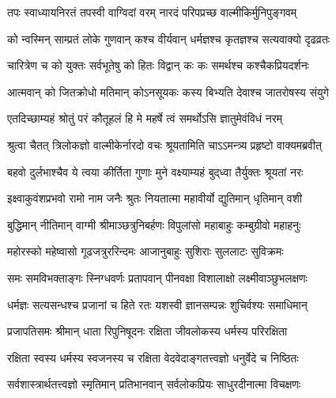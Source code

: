 

\textlink{}
\translink{}

\storymeta


\twolineshloka
{तपः स्वाध्यायनिरतं तपस्वी वाग्विदां वरम्}
{नारदं परिपप्रच्छ वाल्मीकिर्मुनिपुङ्गवम्}%

\twolineshloka
{को न्वस्मिन् साम्प्रतं लोके गुणवान् कश्च वीर्यवान्}
{धर्मज्ञश्च कृतज्ञश्च सत्यवाक्यो दृढव्रतः}%

\twolineshloka
{चारित्रेण च को युक्तः सर्वभूतेषु को हितः}
{विद्वान् कः कः समर्थश्च कश्चैकप्रियदर्शनः}%

\twolineshloka
{आत्मवान् को जितक्रोधो मतिमान् कोऽनसूयकः}
{कस्य बिभ्यति देवाश्च जातरोषस्य संयुगे}%

\twolineshloka
{एतदिच्छाम्यहं श्रोतुं परं कौतूहलं हि मे}
{महर्षे त्वं समर्थोऽसि ज्ञातुमेवंविधं नरम्}%

\twolineshloka
{श्रुत्वा चैतत् त्रिलोकज्ञो वाल्मीकेर्नारदो वचः}
{श्रूयतामिति चाऽऽमन्त्र्य प्रहृष्टो वाक्यमब्रवीत्}%

\twolineshloka
{बहवो दुर्लभाश्चैव ये त्वया कीर्तिता गुणाः}
{मुने वक्ष्याम्यहं बुद्‌ध्वा तैर्युक्तः श्रूयतां नरः}%

\twolineshloka
{इक्ष्वाकुवंशप्रभवो रामो नाम जनैः श्रुतः}
{नियतात्मा महावीर्यो द्युतिमान् धृतिमान् वशी}%

\twolineshloka
{बुद्धिमान् नीतिमान् वाग्मी श्रीमाञ्छत्रुनिबर्हणः}
{विपुलांसो महाबाहुः कम्बुग्रीवो महाहनुः}%

\twolineshloka
{महोरस्को महेष्वासो गूढजत्रुररिन्दमः}
{आजानुबाहुः सुशिराः सुललाटः सुविक्रमः}%

\twolineshloka
{समः समविभक्ताङ्गः स्निग्धवर्णः प्रतापवान्}
{पीनवक्षा विशालाक्षो लक्ष्मीवाञ्छुभलक्षणः}%

\twolineshloka
{धर्मज्ञः सत्यसन्धश्च प्रजानां च हिते रतः}
{यशस्वी ज्ञानसम्पन्नः शुचिर्वश्यः समाधिमान्}%

\twolineshloka
{प्रजापतिसमः श्रीमान् धाता रिपुनिषूदनः}
{रक्षिता जीवलोकस्य धर्मस्य परिरक्षिता}%

\twolineshloka
{रक्षिता स्वस्य धर्मस्य स्वजनस्य च रक्षिता}
{वेदवेदाङ्गतत्त्वज्ञो धनुर्वेदे च निष्ठितः}%

\twolineshloka
{सर्वशास्त्रार्थतत्त्वज्ञो स्मृतिमान् प्रतिभानवान्}
{सर्वलोकप्रियः साधुरदीनात्मा विचक्षणः}%

